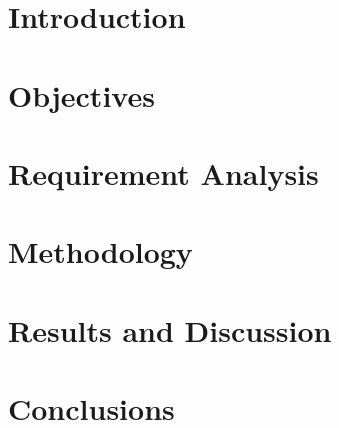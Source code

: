 \documentclass[12pt, twoside]{book}
\let\cleardoublepage\clearpage
\begin{document}
\tableofcontents 
\listoftables
{}%


\mainmatter

\chapter{Introduction}
\label{chap:intro}


\chapter{Objectives}
\label{chap:object}


\chapter{Requirement Analysis}
\label{chap:requirement_analysis}


\chapter{Methodology}
\label{chap:methods}


\chapter{Results and Discussion}
\label{chap:results}


%

\chapter{Conclusions}
\label{chap:conclusions}



\printglossary
\printglossary[type=\acronymtype]
\glsaddallunused

 
 
% 


\appendix  
\clearpage %
\addappheadtotoc 
\appendixpage 
{}%
\clearpage

\end{document}

